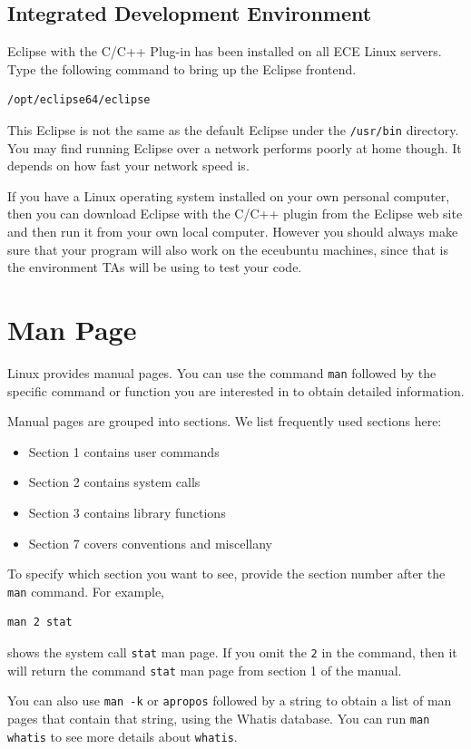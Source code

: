 
\subsection{Integrated Development Environment}
Eclipse with the C/C++ Plug-in has been installed on all ECE Linux servers. Type the following command to bring up the Eclipse frontend.
\begin{lstlisting}[style=bash]
/opt/eclipse64/eclipse
\end{lstlisting}
This Eclipse is not the same as the default Eclipse under the \verb+/usr/bin+ directory. You may find running Eclipse over a network performs poorly at home though. It depends on how fast your network speed is. 

If you have a Linux operating system installed on your own personal computer, then you can download Eclipse with the C/C++ plugin from the Eclipse web site and then run it from your own local computer. However you should always make sure that your program will also work on the eceubuntu machines, since that is the environment TAs will be using to test your code.

\section{Man Page}
Linux provides manual pages. You can use the command \verb+man+ followed by the specific command or function you are interested in to obtain detailed information. 

Manual pages are grouped into sections. We list frequently used sections here: 
\begin{itemize}
\item Section 1 contains user commands
\item Section 2 contains system calls
\item Section 3 contains library functions
\item Section 7 covers conventions and miscellany
\end{itemize}

To specify which section you want to see, provide the section number after the \verb+man+ command. For example,
\begin{lstlisting}[style=bash]
man 2 stat
\end{lstlisting}
shows the system call \verb+stat+ man page. If you omit the \verb+2+ in the command, then it will return the command \verb+stat+ man page from section 1 of the manual.

You can also use \verb+man -k+  or \verb+apropos+ followed by a string to obtain a list of man pages that contain that string, using the Whatis database. You can run \verb+man whatis+ to see more details about \verb+whatis+.

